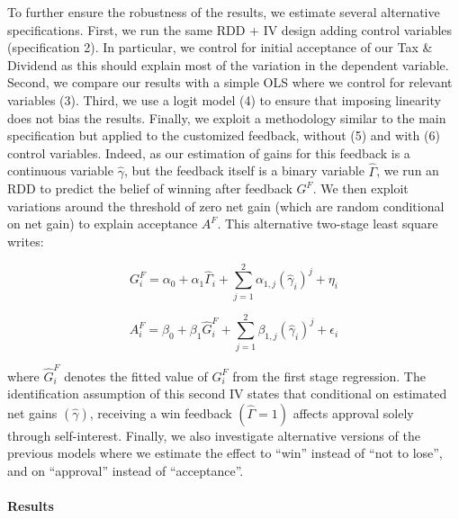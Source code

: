 \documentclass[12pt]{article} %
\begin{document}
To further ensure the robustness of the results, we estimate several alternative specifications. First, we run the same RDD + IV design adding control variables (specification 2). In particular, we control for initial acceptance of our Tax \& Dividend as this should explain most of the variation in the dependent variable. Second, we compare our results with a simple OLS where we control for relevant variables (3). Third, we use a logit model (4) to ensure that imposing linearity does not bias the results. Finally, we exploit a methodology similar to the main specification but applied to the customized feedback, without (5) and with (6) control variables. Indeed, as our estimation of gains for this feedback is a continuous variable $\widehat{\gamma}$, but the feedback itself is a binary variable $\widehat{\Gamma}$, we run an RDD to predict the belief of winning after feedback $G^F$. We then exploit variations around the threshold of zero net gain (which are random conditional on net gain) to explain acceptance $A^F$. This alternative two-stage least square writes: %

\begin{equation}
    G_i^F = \alpha_0 + \alpha_1 \widehat{\Gamma}_{i} + \sum_{j=1}^2 \alpha_{1,j} (\widehat{\gamma}_{i})^{j} + \eta_i
    \label{eq:first_stage_parametric_rdd_approve_winner_feedback}
\end{equation}

\vspace{-.0cm}

\begin{equation}
    A_i^F = \beta_0 + \beta_1 \widehat{G}_i^F + \sum_{j=1}^2 \beta_{1,j} (\widehat{\gamma}_{i})^{j} + \epsilon_i
    \label{eq:second_stage_feed_with_rdd_approve_winner}
\end{equation}

\vspace{.5cm}

\noindent
where $\widehat{G}_i^F$ denotes the fitted value of $G_i^F$ from the first stage regression. The identification assumption of this second IV states that conditional on estimated net gains $(\widehat{\gamma})$, receiving a win feedback $(\widehat{\Gamma} = 1)$ affects approval solely through self-interest. Finally, we also investigate alternative versions of the previous models where we estimate the effect to ``win'' instead of ``not to lose'', and on ``approval'' instead of ``acceptance''.

\paragraph{Results}
\end{document}

